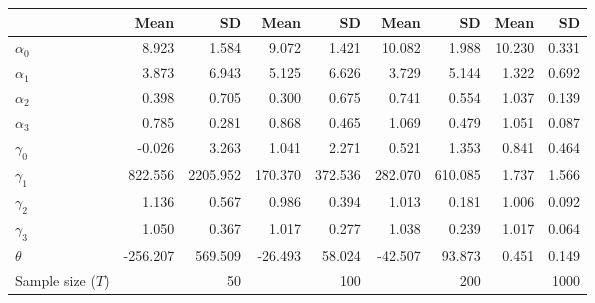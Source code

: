 
\begin{tabular}[t]{lrrrrrrrr}
\toprule
  & Mean & SD & Mean  & SD  & Mean   & SD   & Mean    & SD   \\
\midrule
$\alpha_{0}$ & 8.923 & 1.584 & 9.072 & 1.421 & 10.082 & 1.988 & 10.230 & 0.331\\
$\alpha_{1}$ & 3.873 & 6.943 & 5.125 & 6.626 & 3.729 & 5.144 & 1.322 & 0.692\\
$\alpha_{2}$ & 0.398 & 0.705 & 0.300 & 0.675 & 0.741 & 0.554 & 1.037 & 0.139\\
$\alpha_{3}$ & 0.785 & 0.281 & 0.868 & 0.465 & 1.069 & 0.479 & 1.051 & 0.087\\
$\gamma_{0}$ & -0.026 & 3.263 & 1.041 & 2.271 & 0.521 & 1.353 & 0.841 & 0.464\\
$\gamma_{1}$ & 822.556 & 2205.952 & 170.370 & 372.536 & 282.070 & 610.085 & 1.737 & 1.566\\
$\gamma_{2}$ & 1.136 & 0.567 & 0.986 & 0.394 & 1.013 & 0.181 & 1.006 & 0.092\\
$\gamma_{3}$ & 1.050 & 0.367 & 1.017 & 0.277 & 1.038 & 0.239 & 1.017 & 0.064\\
$\theta$ & -256.207 & 569.509 & -26.493 & 58.024 & -42.507 & 93.873 & 0.451 & 0.149\\
Sample size ($T$) &  & 50 &  & 100 &  & 200 &  & 1000\\
\bottomrule
\end{tabular}
